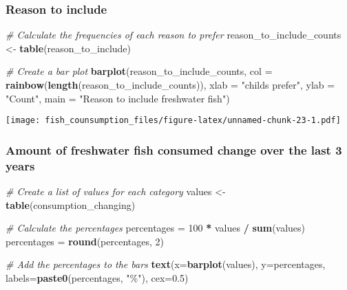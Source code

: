 \documentclass[
]{article}
\newenvironment{Shaded}{\begin{snugshade}}{\end{snugshade}}
\newcommand{\AttributeTok}[1]{\textcolor[rgb]{0.13,0.29,0.53}{#1}}
\newcommand{\CommentTok}[1]{\textcolor[rgb]{0.56,0.35,0.01}{\textit{#1}}}
\newcommand{\DecValTok}[1]{\textcolor[rgb]{0.00,0.00,0.81}{#1}}
\newcommand{\FloatTok}[1]{\textcolor[rgb]{0.00,0.00,0.81}{#1}}
\newcommand{\FunctionTok}[1]{\textcolor[rgb]{0.13,0.29,0.53}{\textbf{#1}}}
\newcommand{\NormalTok}[1]{#1}
\newcommand{\OtherTok}[1]{\textcolor[rgb]{0.56,0.35,0.01}{#1}}
\newcommand{\SpecialCharTok}[1]{\textcolor[rgb]{0.81,0.36,0.00}{\textbf{#1}}}
\newcommand{\StringTok}[1]{\textcolor[rgb]{0.31,0.60,0.02}{#1}}
\begin{document}
\hypertarget{reason-to-include}{%
\subsubsection{Reason to include}\label{reason-to-include}}

\begin{Shaded}
\begin{Highlighting}[]
\CommentTok{\# Calculate the frequencies of each reason to prefer}
\NormalTok{reason\_to\_include\_counts }\OtherTok{\textless{}{-}} \FunctionTok{table}\NormalTok{(reason\_to\_include)}

\CommentTok{\# Create a bar plot}
\FunctionTok{barplot}\NormalTok{(reason\_to\_include\_counts, }\AttributeTok{col =} \FunctionTok{rainbow}\NormalTok{(}\FunctionTok{length}\NormalTok{(reason\_to\_include\_counts)), }
        \AttributeTok{xlab =} \StringTok{"child\textquotesingle{}s prefer"}\NormalTok{, }\AttributeTok{ylab =} \StringTok{"Count"}\NormalTok{, }\AttributeTok{main =} \StringTok{"Reason to include freshwater fish"}\NormalTok{)}
\end{Highlighting}
\end{Shaded}

\texttt{[image: fish\_counsumption\_files/figure-latex/unnamed-chunk-23-1.pdf]}

\hypertarget{amount-of-freshwater-fish-consumed-change-over-the-last-3-years}{%
\subsubsection{Amount of freshwater fish consumed change over the last 3
years}\label{amount-of-freshwater-fish-consumed-change-over-the-last-3-years}}

\begin{Shaded}
\begin{Highlighting}[]
\CommentTok{\# Create a list of values for each category}
\NormalTok{values }\OtherTok{\textless{}{-}} \FunctionTok{table}\NormalTok{(consumption\_changing)}

\CommentTok{\# Calculate the percentages}
\NormalTok{percentages }\OtherTok{=} \DecValTok{100} \SpecialCharTok{*}\NormalTok{ values }\SpecialCharTok{/} \FunctionTok{sum}\NormalTok{(values)}
\NormalTok{percentages }\OtherTok{=} \FunctionTok{round}\NormalTok{(percentages, }\DecValTok{2}\NormalTok{)}

\CommentTok{\# Add the percentages to the bars}
\FunctionTok{text}\NormalTok{(}\AttributeTok{x=}\FunctionTok{barplot}\NormalTok{(values), }\AttributeTok{y=}\NormalTok{percentages, }\AttributeTok{labels=}\FunctionTok{paste0}\NormalTok{(percentages, }\StringTok{"\%"}\NormalTok{), }\AttributeTok{cex=}\FloatTok{0.5}\NormalTok{)}
\end{Highlighting}
\end{Shaded}
\end{document}
